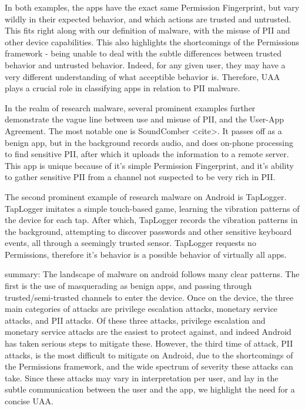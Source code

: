 In both examples, the apps have the exact same Permission Fingerprint, but vary wildly in their expected behavior, and which actions are trusted and untrusted. This fits right along with our definition of malware, with the misuse of PII and other device capabilities. This also highlights the shortcomings of the Permissions framework - being unable to deal with the subtle differences between trusted behavior and untrusted behavior. Indeed, for any given user, they may have a very different understanding of what acceptible behavior is. Therefore, UAA plays a crucial role in classifying apps in relation to PII malware.

In the realm of research malware, several prominent examples further demonstrate the vague line between use and misuse of PII, and the User-App Agreement. The most notable one is SoundComber <cite>. It passes off as a benign app, but in the background records audio, and does on-phone processing to find sensitive PII, after which it uploads the information to a remote server. This app is unique because of it’s simple Permission Fingerprint, and it’s ability to gather sensitive PII from a channel not suspected to be very rich in PII.

The second prominent example of research malware on Android is TapLogger. TapLogger imitates a simple touch-based game, learning the vibration patterns of the device for each tap. After which, TapLogger records the vibration patterns in the background, attempting to discover passwords and other sensitive keyboard events, all through a seemingly trusted sensor. TapLogger requests no Permissions, therefore it’s behavior is a possible behavior of virtually all apps. 

summary:
The landscape of malware on android follows many clear patterns. The first is the use of masquerading as benign apps, and passing through trusted/semi-trusted channels to enter the device. Once on the device, the three main categories of attacks are privilege escalation attacks, monetary service attacks, and PII attacks. Of these three attacks, privilege escalation and monetary service attacks are the easiest to protect against, and indeed Android has taken serious steps to mitigate these. However, the third time of attack, PII attacks, is the most difficult to mitigate on Android, due to the shortcomings of the Permissions framework, and the wide spectrum of severity these attacks can take. Since these attacks may vary in interpretation per user, and lay in the subtle communication between the user and the app, we highlight the need for a concise UAA.
